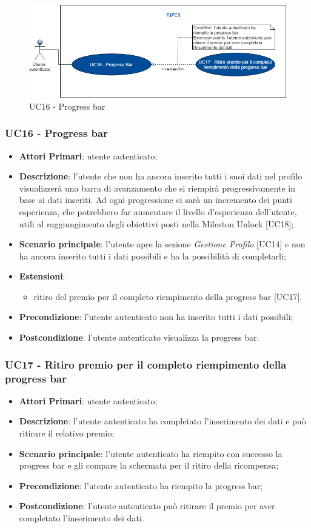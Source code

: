 \begin{figure}[h]
	\includegraphics[width=13cm]{res/images/Schemagenerale7.png}
	\centering
	\caption{UC16 - Progress bar}
\end{figure}
\subsubsection{UC16 - Progress bar}
\begin{itemize}
	\item \textbf{Attori Primari}: utente autenticato;
	\item \textbf{Descrizione}: l'utente che non ha ancora inserito tutti i suoi dati nel profilo visualizzerà una barra di avanzamento che si riempirà progressivamente in base ai dati inseriti. Ad ogni progressione ci sarà un incremento dei punti esperienza, che potrebbero far aumentare il livello d'esperienza dell'utente, utili al raggiungimento degli obiettivi posti nella Mileston Unlock [UC18];
	\item \textbf{Scenario principale}: l'utente apre la sezione \textit{Gestione Profilo} [UC14] e non ha ancora inserito tutti i dati possibili e ha la possibilità di completarli;
	\item \textbf{Estensioni}:
	\begin{itemize}
		\item ritiro del premio per il completo riempimento della progress bar [UC17].
	\end{itemize}
	\item \textbf{Precondizione}: l'utente autenticato non ha inserito tutti i dati possibili;
	\item \textbf{Postcondizione}: l'utente autenticato visualizza la progress bar.
\end{itemize}
\subsubsection{UC17 - Ritiro premio per il completo riempimento della progress bar}
\begin{itemize}
	\item \textbf{Attori Primari}: utente autenticato;
	\item \textbf{Descrizione}: l'utente autenticato ha completato l'inserimento dei dati e può ritirare il relativo premio;	
	\item \textbf{Scenario principale}: l'utente autenticato ha riempito con successo la progress bar e gli compare la schermata per il ritiro della ricompensa;
	\item \textbf{Precondizione}: l'utente autenticato ha riempito la progress bar;
	\item \textbf{Postcondizione}: l'utente autenticato può ritirare il premio per aver completato l'inserimento dei dati.
\end{itemize}
